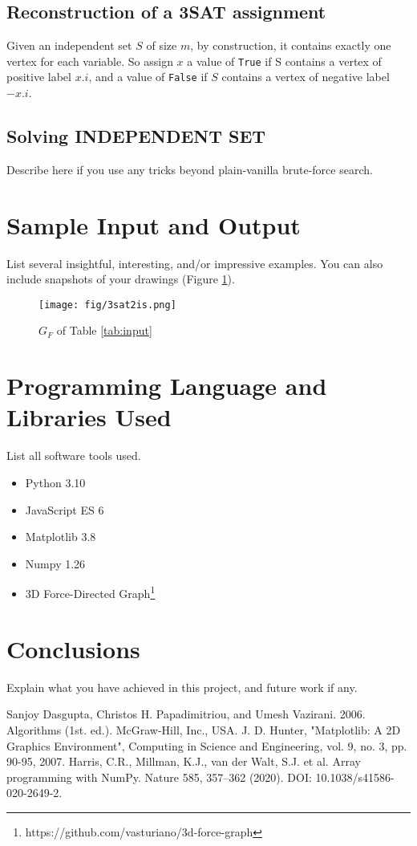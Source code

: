 \documentclass[conference]{IEEEtran}
\begin{document}
\subsection{Reconstruction of a 3SAT assignment}
Given an independent set \(S\) of size \(m\), by construction, it contains exactly one vertex for each variable. So assign \(x\) a value of \texttt{True} if S contains a vertex of positive label \(x.i\), and a value of \texttt{False} if \(S\) contains a vertex of negative label \(-x.i\).

\subsection{Solving INDEPENDENT SET}
Describe here if you use any tricks beyond plain-vanilla brute-force search.

\section{Sample Input and Output}
List several insightful, interesting, and/or impressive examples. You can also include snapshots of your drawings (Figure \ref{fig:example}).

\begin{figure}[htbp]
    \texttt{[image: fig/3sat2is.png]}
    \caption{\(G_F\) of Table \ref{tab:input}}
    \label{fig:example}
\end{figure}

\section{Programming Language and Libraries Used}
List all software tools used.
\begin{itemize}
    \item Python 3.10
    \item JavaScript ES 6
    \item Matplotlib 3.8 \cite{c:plt}
    \item Numpy 1.26 \cite{c:np}
    \item 3D Force-Directed Graph\footnote{https://github.com/vasturiano/3d-force-graph}
\end{itemize}

\section{Conclusions}
Explain what you have achieved in this project, and future work if any.


\begin{thebibliography}{00}
 Sanjoy Dasgupta, Christos H. Papadimitriou, and Umesh Vazirani. 2006. Algorithms (1st. ed.). McGraw-Hill, Inc., USA.
 J. D. Hunter, "Matplotlib: A 2D Graphics Environment", Computing in Science and Engineering, vol. 9, no. 3, pp. 90-95, 2007.
 Harris, C.R., Millman, K.J., van der Walt, S.J. et al. Array programming with NumPy. Nature 585, 357–362 (2020). DOI: 10.1038/s41586-020-2649-2.
\end{thebibliography}
\end{document}
